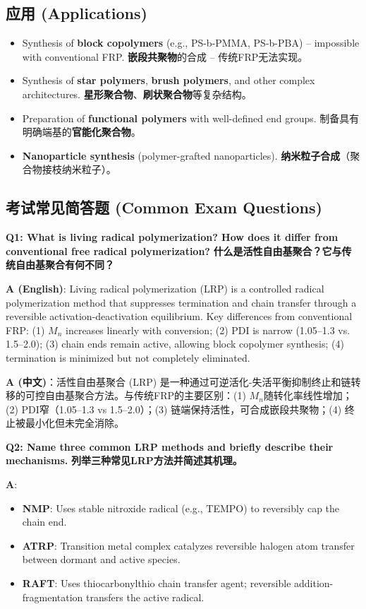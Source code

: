 \documentclass[12pt,a4paper]{ctexart}
\begin{document}
\subsection{应用 (Applications)}
\begin{itemize}
    \item Synthesis of \textbf{block copolymers} (e.g., PS-b-PMMA, PS-b-PBA) – impossible with conventional FRP.  
      \textbf{嵌段共聚物}的合成 – 传统FRP无法实现。
    \item Synthesis of \textbf{star polymers}, \textbf{brush polymers}, and other complex architectures.  
      \textbf{星形聚合物}、\textbf{刷状聚合物}等复杂结构。
    \item Preparation of \textbf{functional polymers} with well-defined end groups.  
      制备具有明确端基的\textbf{官能化聚合物}。
    \item \textbf{Nanoparticle synthesis} (polymer-grafted nanoparticles).  
      \textbf{纳米粒子合成}（聚合物接枝纳米粒子）。
\end{itemize}

\subsection{考试常见简答题 (Common Exam Questions)}

\textbf{Q1: What is living radical polymerization? How does it differ from conventional free radical polymerization?}  
\textbf{什么是活性自由基聚合？它与传统自由基聚合有何不同？}

\textbf{A (English)}: Living radical polymerization (LRP) is a controlled radical polymerization method that suppresses termination and chain transfer through a reversible activation-deactivation equilibrium. Key differences from conventional FRP: (1) $M_n$ increases linearly with conversion; (2) PDI is narrow (1.05–1.3 vs. 1.5–2.0); (3) chain ends remain active, allowing block copolymer synthesis; (4) termination is minimized but not completely eliminated.

\textbf{A (中文)}：活性自由基聚合 (LRP) 是一种通过可逆活化-失活平衡抑制终止和链转移的可控自由基聚合方法。与传统FRP的主要区别：(1) $M_n$随转化率线性增加；(2) PDI窄（1.05–1.3 vs 1.5–2.0）；(3) 链端保持活性，可合成嵌段共聚物；(4) 终止被最小化但未完全消除。

\textbf{Q2: Name three common LRP methods and briefly describe their mechanisms.}  
\textbf{列举三种常见LRP方法并简述其机理。}

\textbf{A}: 
\begin{itemize}
    \item \textbf{NMP}: Uses stable nitroxide radical (e.g., TEMPO) to reversibly cap the chain end.
    \item \textbf{ATRP}: Transition metal complex catalyzes reversible halogen atom transfer between dormant and active species.
    \item \textbf{RAFT}: Uses thiocarbonylthio chain transfer agent; reversible addition-fragmentation transfers the active radical.
\end{itemize}
\end{document}
